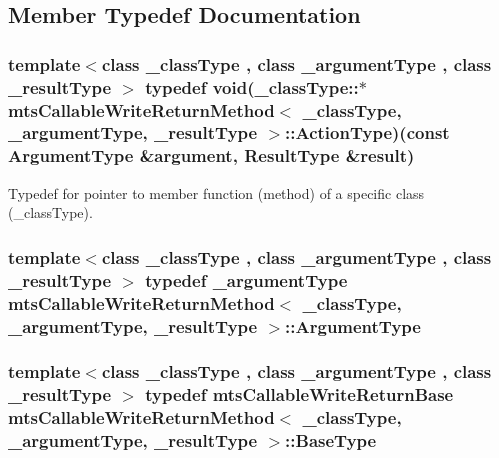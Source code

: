 \subsection{Member Typedef Documentation}
\hypertarget{classmts_callable_write_return_method_a0b5f9726e52abdb0790ccd8c217591b2}{
\subsubsection[{Action\-Type}]{\setlength{\rightskip}{0pt plus 5cm}template$<$class \-\_\-class\-Type , class \-\_\-argument\-Type , class \-\_\-result\-Type $>$ typedef void(\-\_\-class\-Type\-::$\ast$ {\bf mts\-Callable\-Write\-Return\-Method}$<$ \-\_\-class\-Type, \-\_\-argument\-Type, \-\_\-result\-Type $>$\-::Action\-Type)(const {\bf Argument\-Type} \&argument, {\bf Result\-Type} \&result)}}\label{classmts_callable_write_return_method_a0b5f9726e52abdb0790ccd8c217591b2}
Typedef for pointer to member function (method) of a specific class (\-\_\-class\-Type). \hypertarget{classmts_callable_write_return_method_a694e2620eacec8300718daa334cccd01}{
\subsubsection[{Argument\-Type}]{\setlength{\rightskip}{0pt plus 5cm}template$<$class \-\_\-class\-Type , class \-\_\-argument\-Type , class \-\_\-result\-Type $>$ typedef \-\_\-argument\-Type {\bf mts\-Callable\-Write\-Return\-Method}$<$ \-\_\-class\-Type, \-\_\-argument\-Type, \-\_\-result\-Type $>$\-::{\bf Argument\-Type}}}\label{classmts_callable_write_return_method_a694e2620eacec8300718daa334cccd01}
\hypertarget{classmts_callable_write_return_method_a324edde317d1c130c8f88c2f3ff71ed2}{
\subsubsection[{Base\-Type}]{\setlength{\rightskip}{0pt plus 5cm}template$<$class \-\_\-class\-Type , class \-\_\-argument\-Type , class \-\_\-result\-Type $>$ typedef {\bf mts\-Callable\-Write\-Return\-Base} {\bf mts\-Callable\-Write\-Return\-Method}$<$ \-\_\-class\-Type, \-\_\-argument\-Type, \-\_\-result\-Type $>$\-::{\bf Base\-Type}}}\label{classmts_callable_write_return_method_a324edde317d1c130c8f88c2f3ff71ed2}
